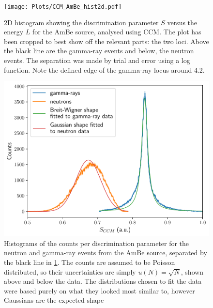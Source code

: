 \documentclass[11pt]{article}
\numberwithin{equation}{section}
\numberwithin{figure}{section}
\numberwithin{table}{section}
\begin{document}
\begin{figure}[H]
    \begin{center}
        \texttt{[image: Plots/CCM\_AmBe\_hist2d.pdf]}
        \caption{2D histogram showing the discrimination parameter $S$ versus the energy $L$ for the AmBe source, analysed using CCM. The plot has been cropped to best show off the relevant parts: the two loci. Above the black line are the gamma-ray events and below, the neutron events. The separation was made by trial and error using a log function. Note the defined edge of the gamma-ray locus around \SI{4.2}{\mevee}.}
        \label{fig:CCM_AmBe_hist2d}
    \end{center}
\end{figure}
\begin{figure}[H]
    \begin{center}
        \includegraphics[scale=0.73]{Plots/CCM_AmBe_separation_hist.pdf}
        \caption{Histograms of the counts per discrimination parameter for the neutron and gamma-ray events from the AmBe source, separated by the black line in \cref{fig:CCM_AmBe_hist2d}. The counts are assumed to be Poisson distributed, so their uncertainties are simply $u(N)=\sqrt{N}$, shown above and below the data. The distributions chosen to fit the data were based purely on what they looked most similar to, however Gaussians are the expected shape}
        \label{fig:CCM_AmBe_separation_hist}
    \end{center}
\end{figure}
\end{document}
